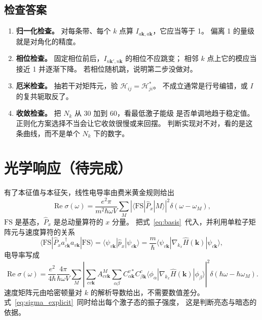 \documentclass[11pt,a4paper]{ctexart}
\newcommand{\todo}{（待完成）}
\newcommand{\kk}{\mathbf{k}}
\begin{document}
\subsection{检查答案}

\begin{enumerate}
  \item \textbf{归一化检查。} 对每条带、每个 $k$ 点算 $I_{a\kk,a\kk}$，它应当等于 1。
        偏离 1 的量级就是对角化的精度。
  \item \textbf{相位检查。} 固定相位前后，$I_{n\kk',n\kk}$ 的相位不应跳变；
        相邻 $k$ 点上它的模应当接近 1 并逐渐下降。
        若相位随机跳，说明第二步没做对。
  \item \textbf{厄米检查。} 抽若干对矩阵元，验 $\mathcal{H}_{ij}=\mathcal{H}^{*}_{ji}$。
        不成立通常是行号编错，或 $I$ 的复共轭取反了。
  \item \textbf{收敛检查。} 把 $N_k$ 从 30 加到 60，看最低激子能级
        是否单调地趋于稳定值。正则化方案选择不当会让它收敛很慢或来回摆。
        判断实现对不对，看的是这条曲线，而不是单个 $N_k$ 下的数字。
\end{enumerate}

\newpage
\section{光学响应\todo}

有了本征值与本征矢，线性电导率由费米黄金规则给出
\begin{equation}
\operatorname{Re}\sigma(\omega)=\frac{e^2\pi}{m^2\hbar\omega V}
\sum_M\left|\langle\mathrm{FS}|\hat P_x|M\rangle\right|^2
\delta(\omega-\omega_M),
\label{eq:sigma}
\end{equation}
$\mathrm{FS}$ 是基态，$\hat P_x$ 是总动量算符的 $x$ 分量。
把式~\eqref{eq:basis}~代入，并利用单粒子矩阵元与速度算符的关系
\begin{equation}
\langle\mathrm{FS}|\hat P_x a^\dagger_{c\kk}a_{v\kk}|\mathrm{FS}\rangle
=\langle\psi_{v\kk}|\hat p_x|\psi_{c\kk}\rangle
=\frac{m}{\hbar}\langle\psi_{v\kk}|\nabla_{k_x}\hat H(\kk)|\psi_{c\kk}\rangle ,
\label{eq:velocity}
\end{equation}
电导率写成
\begin{equation}
\operatorname{Re}\sigma(\omega)=\frac{e^2}{4\hbar}\frac{4\pi}{\hbar\omega V}
\sum_M\left|
\sum_{cv\kk}A^{M}_{cv\kk}
\sum_{\alpha\beta}C^{v*}_{\alpha\kk}C^{c}_{\beta\kk}
\langle\phi_\alpha|\nabla_{k_x}\hat H(\kk)|\phi_\beta\rangle
\right|^2\delta(\hbar\omega-\hbar\omega_M).
\label{eq:sigma_explicit}
\end{equation}
速度矩阵元由哈密顿量对 $k$ 的解析导数给出，不需要数值差分。
式~\eqref{eq:sigma_explicit}~同时给出每个激子态的振子强度，
这是判断亮态与暗态的依据。
\end{document}
